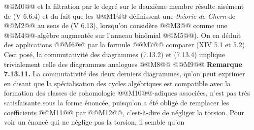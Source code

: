
@@M0@@ et la
filtration par le degré sur le deuxième membre résulte aisément de (V 6.6.4) et du fait que les @@M1@@ définissent une \emph{théorie de Chern} de @@M2@@ au sens de (V 6.13), lorsqu'on considère @@M3@@ comme une @@M4@@-algèbre augmentée sur l'anneau binômial @@M5@@). On en déduit des applications
@@M6@@
par la formule
@@M7@@
comparer (XIV 5.1 et 5.2). Ceci posé, la commutativité des diagrammes (7.13.2) et (7.13.4) implique trivialement celle des diagrammes analogues
@@M8@@
@@M9@@
\textbf{Remarque 7.13.11.} La commutativité des deux derniers diagrammes, qu'on peut exprimer en disant que la spécialisation des cycles algébriques est compatible avec la formation des classes de cohomologie @@M10@@-adiques associées, n'est pas très satisfaisante sous la forme énoncée, puisqu'on a été obligé de remplacer les coefficients @@M11@@ par @@M12@@, c'est-à-dire de négliger la torsion. Pour voir un énoncé qui ne néglige pas la torsion, il semble qu'on
